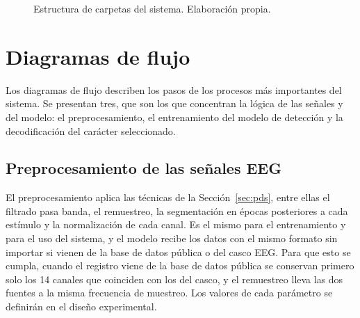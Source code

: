 \begin{figure}[H]
\centering
{}
\caption{Estructura de carpetas del sistema. Elaboración propia.}
\label{fig:carpetas}
\end{figure}

\section[DIAGRAMAS DE FLUJO]{Diagramas de flujo}

Los diagramas de flujo describen los pasos de los procesos más importantes del sistema. Se
presentan tres, que son los que concentran la lógica de las señales y del modelo: el
preprocesamiento, el entrenamiento del modelo de detección y la decodificación del carácter
seleccionado.

\subsection{Preprocesamiento de las señales EEG}

El preprocesamiento aplica las técnicas de la Sección~\ref{sec:pds}, entre ellas el filtrado pasa
banda, el remuestreo, la segmentación en épocas posteriores a cada estímulo y la normalización de
cada canal. Es el mismo para el entrenamiento y para el uso del sistema, y el modelo recibe los datos
con el mismo formato sin importar si vienen de la base de datos pública o del casco EEG. Para que
esto se cumpla, cuando el registro viene de la base de datos pública se conservan primero solo los
14 canales que coinciden con los del casco, y el remuestreo lleva las dos fuentes a la misma
frecuencia de muestreo. Los valores de cada parámetro se definirán en el diseño experimental.

